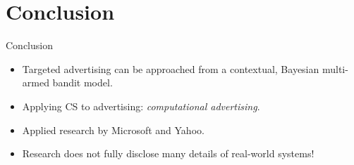 \documentclass{beamer}
\begin{document}
\section{Conclusion}
\frame{\sectionpage}

\begin{frame}{Conclusion}
  \begin{itemize}
    \item{Targeted advertising can be approached from a contextual, Bayesian
      multi-armed bandit model.}
    \item{Applying CS to advertising: \emph{computational advertising}.}
    \item{Applied research by Microsoft and Yahoo.}
    \item{Research does not fully disclose many details of real-world systems!}
  \end{itemize}
\end{frame}
\end{document}

